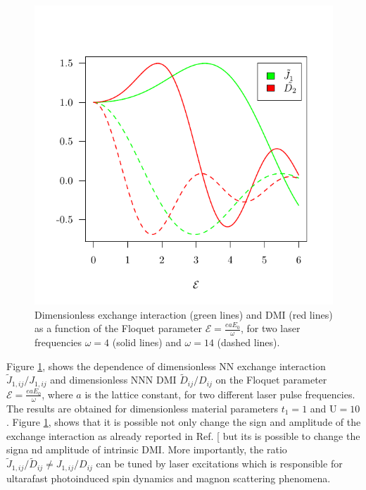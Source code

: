 \documentclass[aps,prl,twocolumn,amsmath,amssymb,nobibnotes]{revtex4-1}%
\renewcommand{\cite}[1]{{[}\onlinecite{#1}{]}}
\begin{document}
\begin{figure}[t]
\centering
\vspace{-1.3cm}
\includegraphics[width=\columnwidth]{NNvsNNN1.pdf}
\vspace{-1cm}
\caption{Dimensionless exchange interaction (green lines) and DMI (red lines) as a function of the Floquet parameter $\mathcal{E} = \frac{eaE_0}{\omega}$, for two laser frequencies $\omega = 4$ (solid lines) and $\omega = 14$ (dashed lines).}
\label{fig2}
\end{figure}

Figure \ref{fig2}, shows the dependence of dimensionless NN exchange interaction $\tilde{J}_{1,ij}/J_{1,ij}$ and dimensionless NNN DMI $\tilde{D}_{ij}/D_{ij}$ on the Floquet parameter $\mathcal{E} = \frac{e a E_0}{\omega}$, where $a$ is the lattice constant, for two different laser pulse frequencies. The results are obtained for dimensionless material parameters $t_1=1$ and $\text{U} = 10$. Figure \ref{fig2}, shows that it is possible not only change the sign and amplitude of the exchange interaction as already reported in Ref. \cite{Mentink2015} but its is possible to change the signa nd amplitude of intrinsic DMI. More importantly, the ratio $\tilde{J}_{1,ij}/\tilde{D}_{ij}\neq J_{1,ij}/D_{ij}$ can be tuned by laser excitations which is responsible for ultarafast photoinduced spin dynamics and magnon scattering phenomena.
\end{document}
